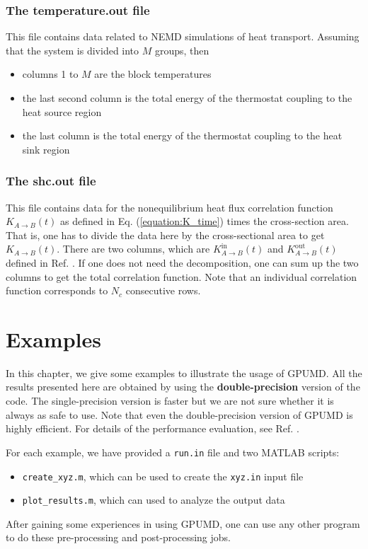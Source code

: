 \documentclass[12pt,a4paper]{report}
\begin{document}
\subsection{The temperature.out file}

This file contains data related to NEMD simulations of heat transport. Assuming that the system is divided into $M$ groups, then
\begin{itemize}
\item columns 1 to $M$ are the block temperatures
\item the last second column is the total energy of the thermostat coupling to the heat source region
\item the last column is the total energy of the thermostat coupling to the heat sink region
\end{itemize}


\subsection{The shc.out file}

This file contains data for the nonequilibrium heat flux correlation function $K_{A \rightarrow B}(t)$ as defined in Eq. (\ref{equation:K_time}) times the cross-section area. That is, one has to divide the data here by the cross-sectional area to get $K_{A \rightarrow B}(t)$. There are two columns, which are $K_{A \rightarrow B}^{\text{in}}(t)$ and $K_{A \rightarrow B}^{\text{out}}(t)$ defined in Ref. \cite{fan2017prb}. If one does not need the decomposition, one can sum up the two columns to get the total correlation function. Note that an individual correlation function corresponds to $N_c$ consecutive rows.

\chapter{Examples}

In this chapter, we give some examples to illustrate the usage of GPUMD. All the results presented here are obtained by using the \textbf{double-precision} version of the code. The single-precision version is faster but we are not sure whether it is always as safe to use.
Note that even the double-precision version of GPUMD is highly efficient. For details of the performance evaluation, see Ref. \cite{fan2017cpc}.

For each example, we have provided a \verb"run.in" file and two MATLAB scripts:
\begin{itemize}
\item \verb"create_xyz.m", which can be used to create the \verb"xyz.in" input file
\item \verb"plot_results.m", which can used to analyze the output data
\end{itemize}
After gaining some experiences in using GPUMD, one can use any other program to do these pre-processing and post-processing jobs.
\end{document}
